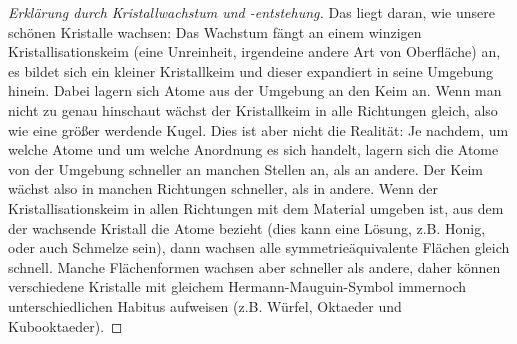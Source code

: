 \begin{proof}[Erklärung durch Kristallwachstum und -entstehung]
Das liegt daran, wie unsere schönen Kristalle wachsen: Das Wachstum fängt an einem winzigen Kristallisationskeim (eine Unreinheit, irgendeine andere Art von Oberfläche) an, es bildet sich ein kleiner Kristallkeim und dieser expandiert in seine Umgebung hinein. Dabei lagern sich Atome aus der Umgebung an den Keim an. Wenn man nicht zu genau hinschaut wächst der Kristallkeim in alle Richtungen gleich, also wie eine größer werdende Kugel. Dies ist aber nicht die Realität: Je nachdem, um welche Atome und um welche Anordnung es sich handelt, lagern sich die Atome von der Umgebung schneller an manchen Stellen an, als an andere. Der Keim wächst also in manchen Richtungen schneller, als in andere. Wenn der Kristallisationskeim in allen Richtungen mit dem Material umgeben ist, aus dem der wachsende Kristall die Atome bezieht (dies kann eine Lösung, z.B. Honig, oder auch Schmelze sein), dann wachsen alle symmetrieäquivalente Flächen gleich schnell. Manche Flächenformen wachsen aber schneller als andere, daher können verschiedene Kristalle mit gleichem Hermann-Mauguin-Symbol immernoch unterschiedlichen Habitus aufweisen (z.B. Würfel, Oktaeder und Kubooktaeder).
\end{proof}
